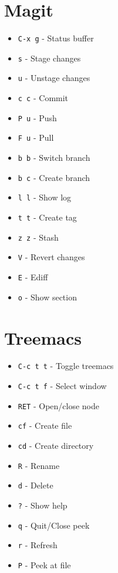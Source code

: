 \documentclass[6pt,landscape]{article}
\newcommand{\key}[1]{\texttt{#1}}
\begin{document}
\begin{multicols*}{5}
\section*{Magit}
\begin{itemize}[leftmargin=*,itemsep=0pt,parsep=0pt,topsep=0pt]
\item \key{C-x g} - Status buffer
\item \key{s} - Stage changes
\item \key{u} - Unstage changes
\item \key{c c} - Commit
\item \key{P u} - Push
\item \key{F u} - Pull
\item \key{b b} - Switch branch
\item \key{b c} - Create branch
\item \key{l l} - Show log
\item \key{t t} - Create tag
\item \key{z z} - Stash
\item \key{V} - Revert changes
\item \key{E} - Ediff
\item \key{o} - Show section
\end{itemize}

\section*{Treemacs}
\begin{itemize}[leftmargin=*,itemsep=0pt,parsep=0pt,topsep=0pt]
\item \key{C-c t t} - Toggle treemacs
\item \key{C-c t f} - Select window
\item \key{RET} - Open/close node
\item \key{cf} - Create file
\item \key{cd} - Create directory
\item \key{R} - Rename
\item \key{d} - Delete
\item \key{?} - Show help
\item \key{q} - Quit/Close peek
\item \key{r} - Refresh
\item \key{P} - Peek at file
\end{itemize}


\end{multicols*}
\end{document}
